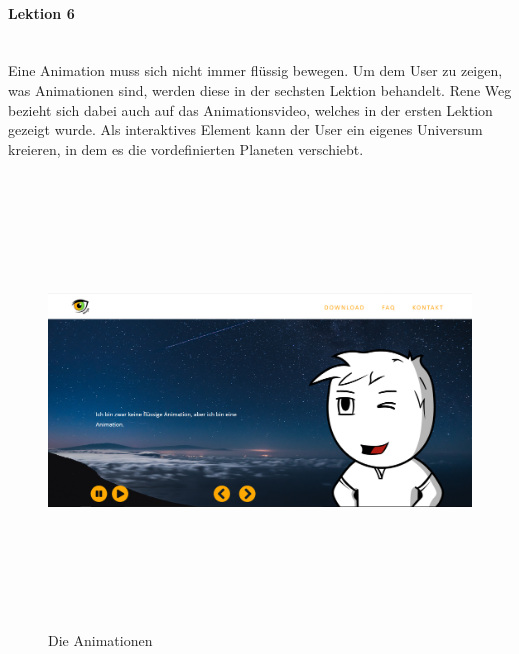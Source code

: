 \paragraph{Lektion 6} \leavevmode \\
Eine Animation muss sich nicht immer flüssig bewegen. Um dem User zu zeigen, was Animationen sind, werden diese in der sechsten Lektion behandelt. Rene Weg bezieht sich dabei auch auf das Animationsvideo, welches in der ersten Lektion gezeigt wurde. Als interaktives Element kann der User ein eigenes Universum kreieren, in dem es die vordefinierten Planeten verschiebt. 
\begin{figure}[h]
	\centering
\includegraphics[width=12cm,height=12cm,keepaspectratio]{webseite_abb17} 
	\caption{Die Animationen}
\end{figure}
